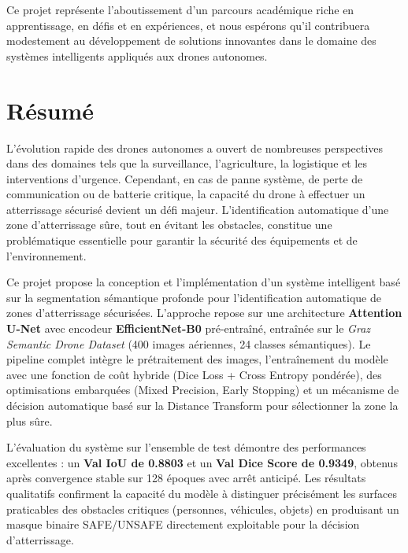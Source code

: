 Ce projet représente l'aboutissement d'un parcours académique riche en apprentissage, en défis et en expériences, et nous espérons qu'il contribuera modestement au développement de solutions innovantes dans le domaine des systèmes intelligents appliqués aux drones autonomes.

\clearpage

\chapter*{Résumé}

L'évolution rapide des drones autonomes a ouvert de nombreuses perspectives dans des domaines tels que la surveillance, l'agriculture, la logistique et les interventions d'urgence. Cependant, en cas de panne système, de perte de communication ou de batterie critique, la capacité du drone à effectuer un atterrissage sécurisé devient un défi majeur. L'identification automatique d'une zone d'atterrissage sûre, tout en évitant les obstacles, constitue une problématique essentielle pour garantir la sécurité des équipements et de l'environnement.

Ce projet propose la conception et l'implémentation d'un système intelligent basé sur la segmentation sémantique profonde pour l'identification automatique de zones d'atterrissage sécurisées. L'approche repose sur une architecture \textbf{Attention U-Net} avec encodeur \textbf{EfficientNet-B0} pré-entraîné, entraînée sur le \textit{Graz Semantic Drone Dataset} (400 images aériennes, 24 classes sémantiques). Le pipeline complet intègre le prétraitement des images, l'entraînement du modèle avec une fonction de coût hybride (Dice Loss + Cross Entropy pondérée), des optimisations embarquées (Mixed Precision, Early Stopping) et un mécanisme de décision automatique basé sur la Distance Transform pour sélectionner la zone la plus sûre.

L'évaluation du système sur l'ensemble de test démontre des performances excellentes : un \textbf{Val IoU de 0.8803} et un \textbf{Val Dice Score de 0.9349}, obtenus après convergence stable sur 128 époques avec arrêt anticipé. Les résultats qualitatifs confirment la capacité du modèle à distinguer précisément les surfaces praticables des obstacles critiques (personnes, véhicules, objets) en produisant un masque binaire SAFE/UNSAFE directement exploitable pour la décision d'atterrissage.

